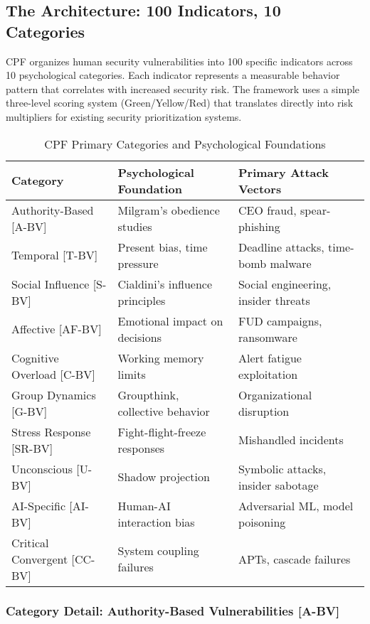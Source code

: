 \documentclass[11pt,a4paper]{article}
\begin{document}
\subsection{The Architecture: 100 Indicators, 10 Categories}

CPF organizes human security vulnerabilities into 100 specific indicators across 10 psychological categories. Each indicator represents a measurable behavior pattern that correlates with increased security risk. The framework uses a simple three-level scoring system (Green/Yellow/Red) that translates directly into risk multipliers for existing security prioritization systems.

\begin{table}[h!]
\centering
\caption{CPF Primary Categories and Psychological Foundations}
\label{tab:cpf_categories}
\begin{tabular}{p{3cm} p{5cm} p{5cm}}
\toprule
\textbf{Category} & \textbf{Psychological Foundation} & \textbf{Primary Attack Vectors} \\
\midrule
Authority-Based [A-BV] & Milgram's obedience studies & CEO fraud, spear-phishing \\
Temporal [T-BV] & Present bias, time pressure & Deadline attacks, time-bomb malware \\
Social Influence [S-BV] & Cialdini's influence principles & Social engineering, insider threats \\
Affective [AF-BV] & Emotional impact on decisions & FUD campaigns, ransomware \\
Cognitive Overload [C-BV] & Working memory limits & Alert fatigue exploitation \\
Group Dynamics [G-BV] & Groupthink, collective behavior & Organizational disruption \\
Stress Response [SR-BV] & Fight-flight-freeze responses & Mishandled incidents \\
Unconscious [U-BV] & Shadow projection & Symbolic attacks, insider sabotage \\
AI-Specific [AI-BV] & Human-AI interaction bias & Adversarial ML, model poisoning \\
Critical Convergent [CC-BV] & System coupling failures & APTs, cascade failures \\
\bottomrule
\end{tabular}
\end{table}

\FloatBarrier

\subsubsection{Category Detail: Authority-Based Vulnerabilities [A-BV]}
\end{document}
